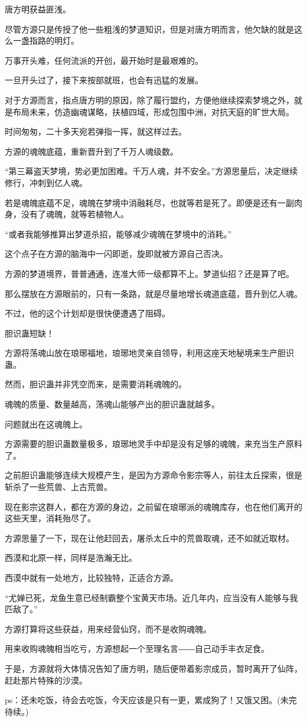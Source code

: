 \begin{this_body}
唐方明获益匪浅。

尽管方源只是传授了他一些粗浅的梦道知识，但是对唐方明而言，他欠缺的就是这么一盏指路的明灯。

万事开头难，任何流派的开创，最开始时是最艰难的。

一旦开头过了，接下来按部就班，也会有迅猛的发展。

对于方源而言，指点唐方明的原因，除了履行盟约，方便他继续探索梦境之外，就是布局未来，仿造幽魂谋略，扶植四域，形成包围中洲，对抗天庭的旷世大局。

时间匆匆，二十多天宛若弹指一挥，就这样过去。

方源的魂魄底蕴，重新晋升到了千万人魂级数。

“第三幕盗天梦境，势必更加困难。千万人魂，并不安全。”方源思量后，决定继续修行，冲刺到亿人魂。

若是魂魄底蕴不足，魂魄在梦境中消融耗尽，也就等若是死了。即便是还有一副肉身，没有了魂魄，就等若植物人。

“或者我能够推算出梦道杀招，能够减少魂魄在梦境中的消耗。”

这个点子在方源的脑海中一闪即逝，旋即就被方源自己否决。

方源的梦道境界，普普通通，连准大师一级都算不上。梦道仙招？还是算了吧。

那么摆放在方源眼前的，只有一条路，就是尽量地增长魂道底蕴，晋升到亿人魂。

不过，他的这个计划却是很快便遭遇了阻碍。

胆识蛊短缺！

方源将荡魂山放在琅琊福地，琅琊地灵亲自领导，利用这座天地秘境来生产胆识蛊。

然而，胆识蛊并非凭空而来，是需要消耗魂魄的。

魂魄的质量、数量越高，荡魂山能够产出的胆识蛊就越多。

问题就出在这魂魄上。

方源需要的胆识蛊数量极多，琅琊地灵手中却是没有足够的魂魄，来充当生产原料了。

之前胆识蛊能够连续大规模产生，是因为方源命令影宗等人，前往太丘探索，很是斩杀了一些荒兽、上古荒兽。

现在影宗这群人，都在方源的身边，之前留在琅琊派的魂魄库存，也在他们离开的这些天里，消耗殆尽了。

方源思量了一下，现在让他赶回去，屠杀太丘中的荒兽取魂，还不如就近取材。

西漠和北原一样，同样是浩瀚无比。

西漠中就有一处地方，比较独特，正适合方源。

“尤婵已死，龙鱼生意已经制霸整个宝黄天市场。近几年内，应当没有人能够与我匹敌了。”

方源打算将这些获益，用来经营仙窍，而不是收购魂魄。

用来收购魂魄相当吃亏，方源想起一个至理名言――自己动手丰衣足食。

于是，方源就将大体情况告知了唐方明，随后便带着影宗成员，暂时离开了仙阵，赶赴那片特殊的沙漠。

ps：还未吃饭，待会去吃饭，今天应该是只有一更，累成狗了！又饿又困。(未完待续。)

\end{this_body}

